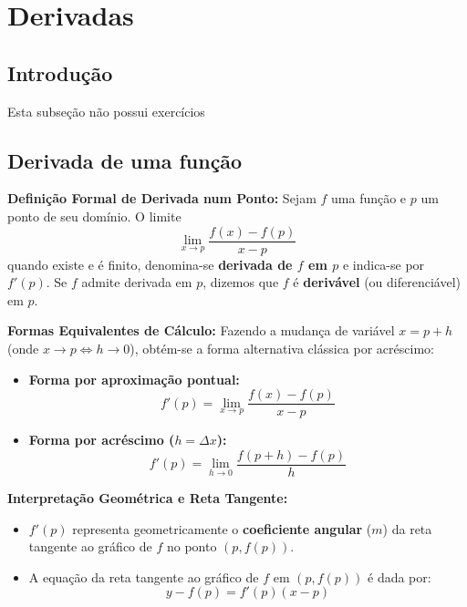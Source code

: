\setcounter{section}{6}
\setcounter{subsection}{0}

\section{Derivadas}

\subsection{Introdução}
Esta subseção não possui exercícios

\subsection{Derivada de uma função}

\begin{recursosbox}
\textbf{Definição Formal de Derivada num Ponto:}
Sejam $f$ uma função e $p$ um ponto de seu domínio. O limite
\[
\lim_{x \to p} \frac{f(x) - f(p)}{x - p}
\]
quando existe e é finito, denomina-se \textbf{derivada de $f$ em $p$} e indica-se por $f'(p)$. Se $f$ admite derivada em $p$, dizemos que $f$ é \textbf{derivável} (ou diferenciável) em $p$.

\vspace{0.2cm}
\textbf{Formas Equivalentes de Cálculo:}
Fazendo a mudança de variável $x = p + h$ (onde $x \to p \iff h \to 0$), obtém-se a forma alternativa clássica por acréscimo:
\begin{itemize}[noitemsep, topsep=2pt]
    \item \textbf{Forma por aproximação pontual:}
    \[
    f'(p) = \lim_{x \to p} \frac{f(x) - f(p)}{x - p}
    \]
    \item \textbf{Forma por acréscimo ($h = \Delta x$):}
    \[
    f'(p) = \lim_{h \to 0} \frac{f(p + h) - f(p)}{h}
    \]
\end{itemize}

\vspace{0.2cm}
\textbf{Interpretação Geométrica e Reta Tangente:}
\begin{itemize}[noitemsep, topsep=2pt]
    \item $f'(p)$ representa geometricamente o \textbf{coeficiente angular} ($m$) da reta tangente ao gráfico de $f$ no ponto $(p, f(p))$.
    \item A equação da reta tangente ao gráfico de $f$ em $(p, f(p))$ é dada por:
    \[
    y - f(p) = f'(p)(x - p)
    \]
\end{itemize}
\end{recursosbox}


